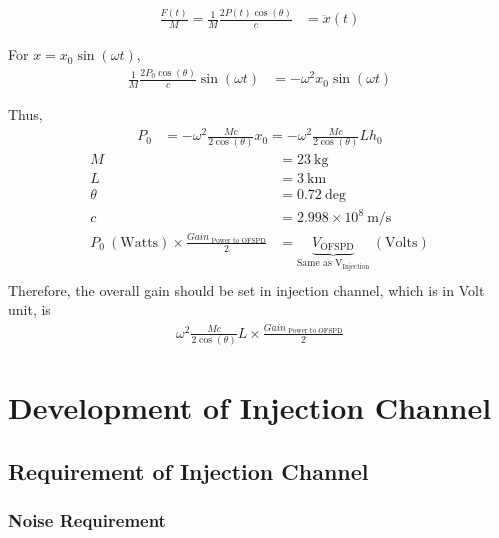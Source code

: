\documentclass[12pt]{caltech_thesis}
\begin{document}

\begin{align}
    \frac{F(t)}{M}=\frac{1}{M} \frac{2 P(t) \cos(\theta)}{c} &= \ddot{x}(t)
\end{align}

For $x=x_0 \sin(\omega t)$,
\begin{align}
    \frac{1}{M} \frac{2 P_0 \cos(\theta)}{c} \sin(\omega t) &=  -\omega^2 x_0 \sin(\omega t)
\end{align}

Thus,
\begin{align}
    P_0 &= -\omega^2 \frac{M c}{2 \cos(\theta)} x_0 = -\omega^2 \frac{M c}{2 \cos(\theta)} L h_0
\end{align}
\begin{align*}
    M &= 23 ~\mathrm{kg} \\
    L &= 3 ~\mathrm{km}  \\
    \theta &= 0.72 ~\mathrm{deg}  \\
    c &= 2.998\times10^8 ~\mathrm{m/s} \\
    P_0 ~(\mathrm{Watts}) \times \frac{Gain_{\text{~Power to OFSPD}}}{2} &= 
     \underbrace{V_{\text{OFSPD}}}_{\text{Same as V$_{\text{Injection}}$}}~ (\mathrm{Volts}) \\
\end{align*}
Therefore, the overall gain should be set in injection channel, which is in Volt unit, is
\begin{align}
    \omega^2 \frac{M c}{2 \cos(\theta)} L \times \frac{Gain_{\text{~Power to OFSPD}} }{2}
\end{align}







\chapter{Development of Injection Channel}

\section{Requirement of Injection Channel}
\subsection{Noise Requirement}
\end{document}
